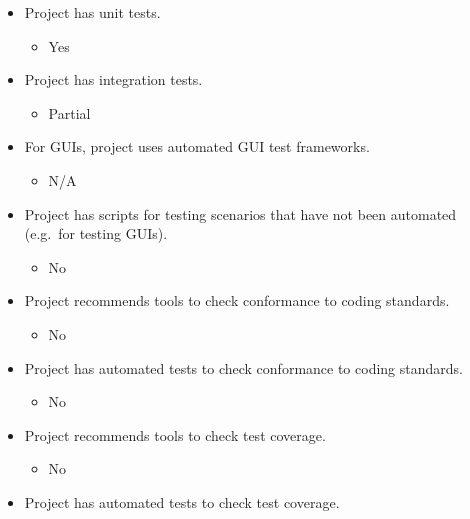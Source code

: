 \begin{itemize}
\itemsep1pt\parskip0pt
\item
  Project has unit tests.

  \begin{itemize}
  \itemsep1pt\parskip0pt
  \item
    Yes
  \end{itemize}
\item
  Project has integration tests.

  \begin{itemize}
  \itemsep1pt\parskip0pt
  \item
    Partial
  \end{itemize}
\item
  For GUIs, project uses automated GUI test frameworks.

  \begin{itemize}
  \itemsep1pt\parskip0pt
  \item
    N/A
  \end{itemize}
\item
  Project has scripts for testing scenarios that have not been automated
  (e.g.~for testing GUIs).

  \begin{itemize}
  \itemsep1pt\parskip0pt
  \item
    No
  \end{itemize}
\item
  Project recommends tools to check conformance to coding standards.

  \begin{itemize}
  \itemsep1pt\parskip0pt
  \item
    No
  \end{itemize}
\item
  Project has automated tests to check conformance to coding standards.

  \begin{itemize}
  \itemsep1pt\parskip0pt
  \item
    No
  \end{itemize}
\item
  Project recommends tools to check test coverage.

  \begin{itemize}
  \itemsep1pt\parskip0pt
  \item
    No
  \end{itemize}
\item
  Project has automated tests to check test coverage.


\end{itemize}
